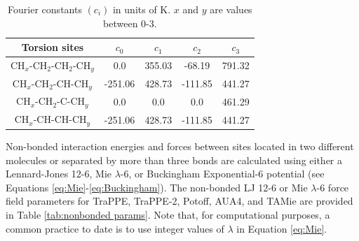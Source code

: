 \documentclass[preprint,letterpaper,floatfix,citeautoscript,aip,jcp]{revtex4-1}
\begin{document}
\begin{table}[h!]
	\caption{Fourier constants $(c_i)$ in units of K. $x$ and $y$ are values between 0-3.} \label{tab:torsions}
	\begin{center}
		\begin{tabular}{|c|c|c|c|c|}
			\hline
			Torsion sites & $c_0$ & $c_1$ & $c_2$ & $c_3$ \\ \hline
			CH$_x$-CH$_2$-CH$_2$-CH$_y$ & 0.0 & 355.03 & -68.19 & 791.32 \\ 
            CH$_x$-CH$_2$-CH-CH$_y$ & -251.06 & 428.73 & -111.85 & 441.27 \\
            CH$_x$-CH$_2$-C-CH$_y$ & 0.0 & 0.0 & 0.0 & 461.29 \\
            CH$_x$-CH-CH-CH$_y$ & -251.06 & 428.73 & -111.85 & 441.27 \\
			\hline
		\end{tabular}
	\end{center} 
\end{table}
Non-bonded interaction energies and forces between sites located in two different molecules or separated by more than three bonds are calculated using either a Lennard-Jones 12-6, Mie $\lambda$-6, or Buckingham Exponential-6 potential (see Equations \ref{eq:Mie}-\ref{eq:Buckingham}). 
%
%
%
The non-bonded LJ 12-6 or Mie $\lambda$-6 force field parameters for TraPPE, TraPPE-2, Potoff, AUA4, and TAMie are provided in Table \ref{tab:nonbonded params}. Note that, for computational purposes, a common practice to date is to use integer values of $\lambda$ in Equation \ref{eq:Mie}. 
\end{document}
